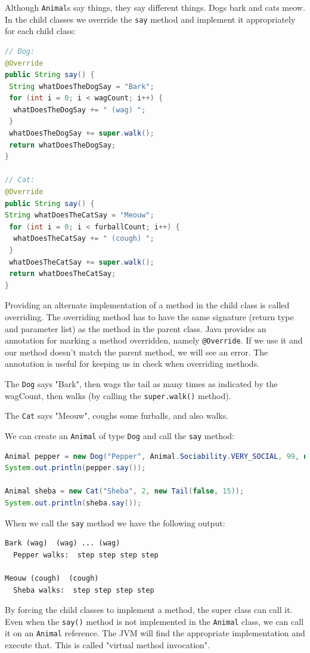 Although \texttt{Animal}s say things, they say different things. Dogs bark and cats meow. In the child classes we override the \texttt{say} method and implement it appropriately for each child class:
\begin{lstlisting}[language=Java]
// Dog:
@Override
public String say() {
 String whatDoesTheDogSay = "Bark";
 for (int i = 0; i < wagCount; i++) {
  whatDoesTheDogSay += " (wag) ";
 }
 whatDoesTheDogSay += super.walk();
 return whatDoesTheDogSay;
}
  
// Cat:
@Override
public String say() {
String whatDoesTheCatSay = "Meouw";
 for (int i = 0; i < furballCount; i++) {
  whatDoesTheCatSay += " (cough) ";
 }
 whatDoesTheCatSay += super.walk();
 return whatDoesTheCatSay;
}
\end{lstlisting}
Providing an alternate implementation of a method in the child class is called overriding. The overriding method has to have the same signature (return type and parameter list) as the method in the parent class. Java provides an annotation for marking a method overridden, namely \texttt{@Override}. If we use it and our method doesn't match the parent method, we will see an error. The annotation is useful for keeping us in check when overriding methods.

The \texttt{Dog} says "Bark", then wags the tail as many times as indicated by the wagCount, then walks (by calling the \texttt{super.walk()} method).

The \texttt{Cat} says "Meouw", coughs some furballs, and also walks.

We can create an \texttt{Animal} of type \texttt{Dog} and call the \texttt{say} method:

\begin{lstlisting}[language=Java]
Animal pepper = new Dog("Pepper", Animal.Sociability.VERY_SOCIAL, 99, new Tail(true, 1));
System.out.println(pepper.say());

Animal sheba = new Cat("Sheba", 2, new Tail(false, 15));
System.out.println(sheba.say());
\end{lstlisting}


When we call the \texttt{say} method we have the following output:
\begin{lstlisting}
Bark (wag)  (wag) ... (wag)
  Pepper walks:  step step step step

Meouw (cough)  (cough)
  Sheba walks:  step step step step
\end{lstlisting}

By forcing the child classes to implement a method, the super class can call it. Even when the \texttt{say()} method is not implemented in the \texttt{Animal} class, we can call it on an \texttt{Animal} reference. The JVM will find the appropriate implementation and execute that. This is called "virtual method invocation".

